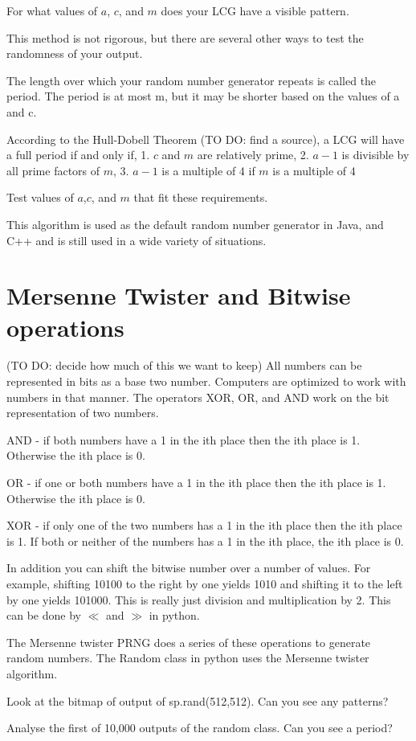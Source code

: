 \begin{problem}
For what values of $a$, $c$, and $m$ does your LCG have a visible pattern.
\end{problem}

This method is not rigorous, but there are several other ways to test the randomness of your output.

The length over which your random number generator repeats is called the period.
The period is at most m, but it may be shorter based on the values of a and c.
 
According to the Hull-Dobell Theorem (TO DO: find a source), a LCG will have a full period if and only if, 
1. $c$ and $m$ are relatively prime,
2. $a-1$ is divisible by all prime factors of $m$,
3. $a-1$ is a multiple of 4 if $m$ is a multiple of 4

\begin{problem}
Test values of $a$,$c$, and $m$ that fit these requirements. 
\end{problem}

This algorithm is used as the default random number generator in Java, and C++ and is still used in a wide variety of situations.

\section*{Mersenne Twister and Bitwise operations}

(TO DO: decide how much of  this we want to keep) All numbers can be represented in bits as a base two number.
Computers are optimized to work with numbers in that manner.
The operators XOR, OR, and AND work on the bit representation of two numbers.

AND - if both numbers have a 1 in the ith place then the ith place is 1.
Otherwise the ith place is 0.

OR - if one or both numbers have a 1 in the ith place then the ith place is 1.
Otherwise the ith place is 0.

XOR - if only one of the two numbers has a 1 in the ith place then the ith place is 1.
If both or neither of the numbers has a 1 in the ith place, the ith place is 0.

In addition you can shift the bitwise number over a number of values.
For example, shifting 10100 to the right by one yields 1010 and shifting it to the left by one yields 101000.
This is really just division and multiplication by 2.
This can be done by $\ll$ and $\gg$ in python. 

The Mersenne twister PRNG does a series of these operations to generate random numbers.
The Random class in python uses the Mersenne twister algorithm. 

\begin{problem}
Look at the bitmap of output of sp.rand(512,512).
Can you see any patterns?
\end{problem}

\begin{problem}
Analyse the first of 10,000 outputs of the random class.
Can you see a period?
\end{problem}
